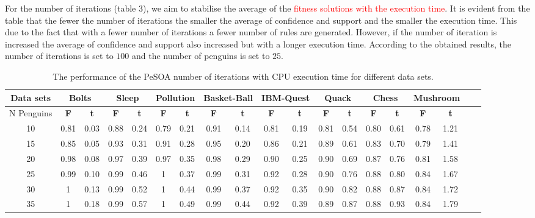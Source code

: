 \documentclass[preprint,12pt]{elsarticle}
\begin{document}
For the number of iterations (table 3), we aim to stabilise the average of the \textcolor {red}{fitness solutions with the execution time}. It is evident from the table that the fewer the number of iterations the smaller the average of confidence and support and the smaller the execution time. This due to the fact that with a fewer number of iterations a fewer number of rules are generated. However, if the number of iteration is increased the average of confidence and support also increased but with a longer execution time. According to the obtained results, 
the number of iterations is set to $100$ and the number of penguins is set to $25$.
\begin{landscape}
\begin{table}[b]
\caption{The performance of the PeSOA number of iterations with CPU execution time for different data sets.}
\label{sample-table}
\begin{tabular}{c c c c c c c c c c c c c c c c c c c}
\toprule
\textbf{Data sets} &  \multicolumn{2}{c}{Bolts} & \multicolumn{2}{c}{Sleep} & \multicolumn{2}{c}{Pollution}& \multicolumn{2}{c}{Basket-Ball}& \multicolumn{2}{c}{IBM-Quest}& \multicolumn{2}{c}{Quack}& \multicolumn{2}{c}{Chess}& \multicolumn{2}{c}{Mushroom}\\\midrule
{N Penguins}   & \textbf{F}  & \textbf{t}  & \textbf{F}  & \textbf{t} & \textbf{F}  & \textbf{t} & \textbf{F}  & \textbf{t} & \textbf{F}  & \textbf{t} & \textbf{F}  & \textbf{t} & \textbf{F}  & \textbf{t} & \textbf{F}  & \textbf{t} \\\hline                      
10		&		0.81 & 	0.03		& 		0.88 & 	0.24	&		0.79 & 0.21	&		0.91 & 	0.14		&	 0.81 &	0.19	& 0.81 &  0.54 &	0.80 &	0.61  &	0.78 & 	1.21 \\\hline
15		&		0.85 & 	0.05		& 		0.93 & 	0.31	&		0.91 & 0.28	&		0.95 & 	0.20		&	 0.86 & 0.21	& 0.89 &  0.61 &	0.83 &	0.70  &	0.79 &	1.41 \\\hline
20    &		0.98 & 	0.08		& 		0.97 & 	0.39	&		0.97 & 0.35	&		0.98 & 	0.29		&	 0.90 &	0.25	& 0.90 &  0.69 &	0.87 &	0.76  &	0.81 &  1.58	 \\\hline
25		&		0.99 & 	0.10		& 		0.99 & 	0.46	&		1    & 0.37	&	  0.99 & 	0.31	  &	 0.92 &	0.28	& 0.90 &  0.76 &	0.88 &  0.80  &	0.84 & 	1.67 \\\hline
30		&	  1    & 	0.13		& 		0.99 & 	0.52  &		1    & 0.44	&		0.99 & 	0.37		&	 0.92 &	0.35	& 0.90 &  0.82 &	0.88 &  0.87  &	0.84 &  1.72 \\\hline
35	  &		1    & 	0.18	  & 		0.99 & 	0.57	&		1    & 0.49	&		0.99 & 	0.44 	  &	 0.92 &	0.39	& 0.89 &  0.87 &	0.88 &  0.93  & 0.84 & 	1.79 \\\hline

\end{tabular}
\end{table}
\end{landscape}
\end{document}
